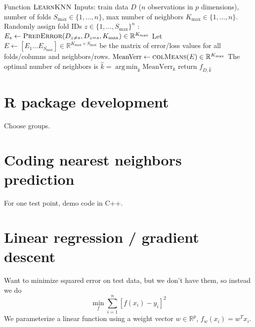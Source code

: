 \documentclass{article}
\DeclareMathOperator*{\argmin}{arg\,min}
\begin{document}
\begin{algorithmic}[1]
  \State Function $\textsc{LearnKNN}$
  \State Inputs: train data $D$ ($n$ observations in $p$ dimensions), 
  number of folds $S_{\text{max}}\in\{1,\dots, n\}$, 
  max number of neighbors $K_{\text{max}}\in\{1, \dots, n\}$.
  \State Randomly assign fold IDs $z\in\{1,\dots,S_{\text{max}}\}^n$
  :
  \State $E_s\gets \textsc{PredError}(D_{z\neq s}, D_{z=s}, K_{\text{max}})\in\mathbb R^{K_{\text{max}}}$
  \EndFor
  Let
  $E\gets[E_1 ... E_{S_{\text{max}}}]\in\mathbb R^{K_{\text{max}}\times
    S_{\text{max}}}$ be the matrix of error/loss values for all
  folds/columns and neighbors/rows.
  \State $\text{MeanVerr}\gets \textsc{colMeans}(E)\in\mathbb R^{K_{\text{max}}}$
  \State The optimal number of neighbors is $\hat k = \argmin_k \text{MeanVerr}_k$
  \State return $f_{D,\hat k}$
\end{algorithmic}

\section{R package development}

Choose groups.

\section{Coding nearest neighbors prediction}

For one test point, demo code in C++.

\section{Linear regression / gradient descent}

Want to minimize squared error on test data, but we don't have them,
so instead we do
\begin{equation}
  \min_f \sum_{i=1}^n [f(x_i)-y_i]^2
\end{equation}
We parameterize a linear function using a weight vector $w\in\mathbb R^p$,
$f_w(x_i)=w^T x_i$. 
\end{document}
